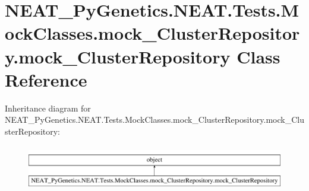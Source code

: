 \hypertarget{classNEAT__PyGenetics_1_1NEAT_1_1Tests_1_1MockClasses_1_1mock__ClusterRepository_1_1mock__ClusterRepository}{}\section{N\+E\+A\+T\+\_\+\+Py\+Genetics.\+N\+E\+A\+T.\+Tests.\+Mock\+Classes.\+mock\+\_\+\+Cluster\+Repository.\+mock\+\_\+\+Cluster\+Repository Class Reference}
\label{classNEAT__PyGenetics_1_1NEAT_1_1Tests_1_1MockClasses_1_1mock__ClusterRepository_1_1mock__ClusterRepository}
Inheritance diagram for N\+E\+A\+T\+\_\+\+Py\+Genetics.\+N\+E\+A\+T.\+Tests.\+Mock\+Classes.\+mock\+\_\+\+Cluster\+Repository.\+mock\+\_\+\+Cluster\+Repository\+:\begin{figure}[H]
\begin{center}
\leavevmode
\includegraphics[height=2.000000cm]{classNEAT__PyGenetics_1_1NEAT_1_1Tests_1_1MockClasses_1_1mock__ClusterRepository_1_1mock__ClusterRepository}
\end{center}
\end{figure}

